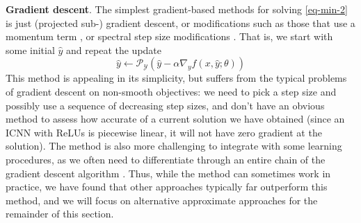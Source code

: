 \textbf{Gradient descent}. The simplest gradient-based methods for solving
\cref{eq-min-2} is just (projected sub-) gradient descent, or modifications
such as
those that use a momentum term \citep{polyak1964some,rumelhart1988learning}, or
spectral step size modifications \citep{barzilai1988two,birgin2000nonmonotone}.
That is, we start with some initial $\hat{y}$ and repeat the update
\begin{equation}
\hat{y} \leftarrow \mathcal{P}_\mathcal{Y} \left (\hat{y} - \alpha \nabla_y f
(x,\hat{y};\theta) \right )
\end{equation}
This method is appealing in its simplicity, but suffers from the typical
problems of gradient descent on non-smooth objectives: we need to pick a
step size and possibly use a sequence of decreasing step sizes, and don't have an
obvious method to assess how accurate of a current solution we have obtained
(since an ICNN with ReLUs is piecewise linear, it will not have
zero gradient at the solution).
The method is also more challenging to integrate with some learning
procedures, as we often need to differentiate through an entire chain of the
gradient descent algorithm \citep{domke2012generic}. Thus, while the method can
sometimes
work in practice, we have found that other approaches typically far outperform
this method, and we will focus on alternative approximate approaches for the
remainder of this section.

